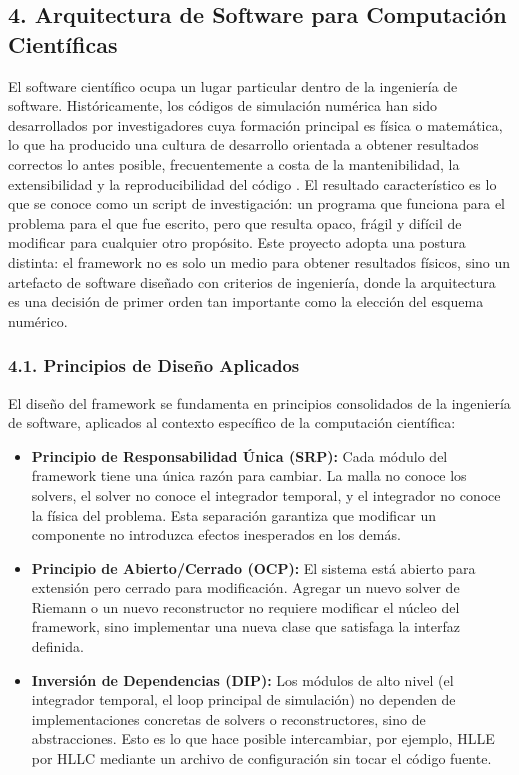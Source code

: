 \documentclass[11pt,openany]{book}
\begin{document}
\subsection{4. Arquitectura de Software para Computación Científicas}

El software científico ocupa un lugar particular dentro de la ingeniería de software. Históricamente, los códigos de simulación numérica han sido desarrollados por investigadores cuya formación principal es física o matemática, lo que ha producido una cultura de desarrollo orientada a obtener resultados correctos lo antes posible, frecuentemente a costa de la mantenibilidad, la extensibilidad y la reproducibilidad del código \parencite{ramakrishnan2017ten}. El resultado característico es lo que se conoce como un script de investigación: un programa que funciona para el problema para el que fue escrito, pero que resulta opaco, frágil y difícil de modificar para cualquier otro propósito.
Este proyecto adopta una postura distinta: el framework no es solo un medio para obtener resultados físicos, sino un artefacto de software diseñado con criterios de ingeniería, donde la arquitectura es una decisión de primer orden tan importante como la elección del esquema numérico.

\subsubsection{4.1. Principios de Diseño Aplicados}\textbf{}

El diseño del framework se fundamenta en principios consolidados de la ingeniería de software, aplicados al contexto específico de la computación científica:

\begin{itemize}
    \item \textbf{Principio de Responsabilidad Única (SRP):} Cada módulo del framework tiene una única razón para cambiar. La malla no conoce los solvers, el solver no conoce el integrador temporal, y el integrador no conoce la física del problema. Esta separación garantiza que modificar un componente no introduzca efectos inesperados en los demás.
    \item \textbf{Principio de Abierto/Cerrado (OCP):} El sistema está abierto para extensión pero cerrado para modificación. Agregar un nuevo solver de Riemann o un nuevo reconstructor no requiere modificar el núcleo del framework, sino implementar una nueva clase que satisfaga la interfaz definida.
    \item \textbf{Inversión de Dependencias (DIP):} Los módulos de alto nivel (el integrador temporal, el loop principal de simulación) no dependen de implementaciones concretas de solvers o reconstructores, sino de abstracciones. Esto es lo que hace posible intercambiar, por ejemplo, HLLE por HLLC mediante un archivo de configuración sin tocar el código fuente.
\end{itemize}
\end{document}
